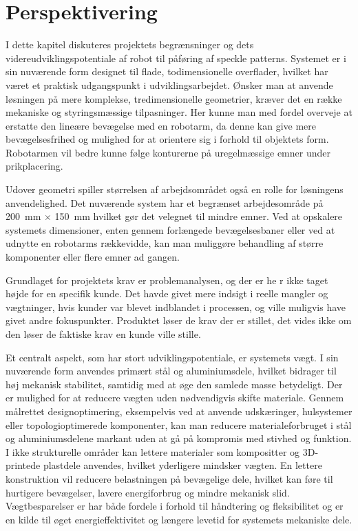 \chapter{Perspektivering} \label{Perspektivering}
I dette kapitel diskuteres projektets begrænsninger og dets videreudviklingspotentiale af robot til påføring af speckle patterns. Systemet er i sin nuværende form designet til flade, todimensionelle overflader, hvilket har været et praktisk udgangspunkt i udviklingsarbejdet. Ønsker man at anvende løsningen på mere komplekse, tredimensionelle geometrier, kræver det en række mekaniske og styringsmæssige tilpasninger. Her kunne man med fordel overveje at erstatte den lineære bevægelse med en robotarm, da denne kan give mere bevægelsesfrihed og mulighed for at orientere sig i forhold til objektets form. Robotarmen vil bedre kunne følge konturerne på uregelmæssige emner under prikplacering. 

Udover geometri spiller størrelsen af arbejdsområdet også en rolle for løsningens anvendelighed. Det nuværende system har et begrænset arbejdesområde på \SI{200}{mm} $\times$ \SI{150}{mm} hvilket gør det velegnet til mindre emner. Ved at opskalere systemets dimensioner, enten gennem forlængede bevægelsesbaner eller ved at udnytte en robotarms rækkevidde, kan man muliggøre behandling af større komponenter eller flere emner ad gangen.

Grundlaget for projektets krav er problemanalysen, og der er he r ikke taget højde for en specifik kunde. Det havde givet mere indsigt i reelle mangler og vægtninger, hvis kunder var blevet indblandet i processen, og ville muligvis have givet andre fokuspunkter. Produktet løser de krav der er stillet, det vides ikke om den løser de faktiske krav en kunde ville stille.

Et centralt aspekt, som har stort udviklingspotentiale, er systemets vægt. I sin nuværende form anvendes primært stål og aluminiumsdele, hvilket bidrager til høj mekanisk stabilitet, samtidig med at øge den samlede masse betydeligt. Der er mulighed for at reducere vægten uden nødvendigvis skifte materiale. Gennem målrettet designoptimering, eksempelvis ved at anvende udskæringer, hulsystemer eller topologioptimerede komponenter, kan man reducere materialeforbruget i stål og aluminiumsdelene markant uden at gå på kompromis med stivhed og funktion. I ikke strukturelle områder kan lettere materialer som kompositter og 3D-printede plastdele anvendes, hvilket yderligere mindsker vægten. En lettere konstruktion vil reducere belastningen på bevægelige dele, hvilket kan føre til hurtigere bevægelser, lavere energiforbrug og mindre mekanisk slid. Vægtbesparelser er har både fordele i forhold til håndtering og fleksibilitet og er en kilde til øget energieffektivitet og længere levetid for systemets mekaniske dele. 

